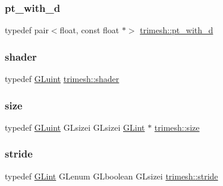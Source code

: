 \mbox{\label{namespacetrimesh_ab64100c6e8b0f92c8b80af7e509bd6d9}} 
\subsubsection{\texorpdfstring{pt\+\_\+with\+\_\+d}{pt\_with\_d}}
{\footnotesize\ttfamily typedef pair$<$float, const float $\ast$$>$ \hyperlink{namespacetrimesh_ab64100c6e8b0f92c8b80af7e509bd6d9}{trimesh\+::pt\+\_\+with\+\_\+d}}

\mbox{\label{namespacetrimesh_ad4924c86524ecb5ebcbc84cc71eee0f6}} 
\subsubsection{\texorpdfstring{shader}{shader}}
{\footnotesize\ttfamily typedef \hyperlink{namespacetrimesh_ad2289423ef47b393854afc30451d433b}{G\+Luint} \hyperlink{namespacetrimesh_ad4924c86524ecb5ebcbc84cc71eee0f6}{trimesh\+::shader}}

\mbox{\label{namespacetrimesh_a1c71e2912be63f694df9e9991bddb15e}} 
\subsubsection{\texorpdfstring{size}{size}}
{\footnotesize\ttfamily typedef \hyperlink{namespacetrimesh_ad2289423ef47b393854afc30451d433b}{G\+Luint} G\+Lsizei G\+Lsizei \hyperlink{namespacetrimesh_aeccc290e30b317c861fb146956528187}{G\+Lint} $\ast$ \hyperlink{namespacetrimesh_a1c71e2912be63f694df9e9991bddb15e}{trimesh\+::size}}

\mbox{\label{namespacetrimesh_adbcc86014e77656be1a9df7ecaae5f2f}} 
\subsubsection{\texorpdfstring{stride}{stride}}
{\footnotesize\ttfamily typedef \hyperlink{namespacetrimesh_aeccc290e30b317c861fb146956528187}{G\+Lint} G\+Lenum G\+Lboolean G\+Lsizei \hyperlink{namespacetrimesh_adbcc86014e77656be1a9df7ecaae5f2f}{trimesh\+::stride}}

